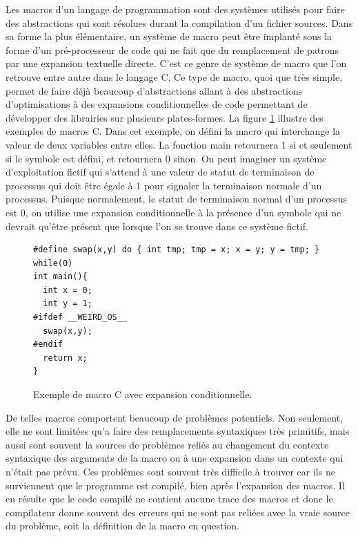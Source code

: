 \documentclass[12pt,oneside,letterpaper,francais]{book}
\newcommand{\scheme}[1]{\selectlanguage{english}{\tt #1}\selectlanguage{french}}
\begin{document}
Les macros d'un langage de programmation sont des systèmes utilisés
pour faire des abstractions qui sont résolues durant la compilation
d'un fichier sources. Dans sa forme la plus élémentaire, un système de
macro peut être implanté sous la forme d'un pré-processeur de code qui
ne fait que du remplacement de patrons par une expansion textuelle
directe. C'est ce genre de système de macro que l'on retrouve entre
autre dans le langage C. Ce type de macro, quoi que très simple,
permet de faire déjà beaucoup d'abstractions allant à des abstractions
d'optimisations à des expansions conditionnelles de code permettant de
développer des librairies sur plusieurs plates-formes. La figure
\ref{Scheme:c-macros} illustre des exemples de macros C. Dans cet
exemple, on défini la macro \scheme{swap} qui interchange la valeur de
deux variables entre elles. La fonction main retournera 1 si et
seulement si le symbole \scheme{\_\_WEIRD\_OS\_\_} est défini, et
retournera 0 sinon. On peut imaginer un système d'exploitation fictif
qui s'attend à une valeur de statut de terminaison de processus qui
doit être égale à 1 pour signaler la terminaison normale d'un
processus. Puisque normalement, le statut de terminaison normal d'un
processus est 0, on utilise une expansion conditionnelle à la présence
d'un symbole qui ne devrait qu'être présent que lorsque l'on se trouve
dans ce système fictif.\\

\begin{figure}[htb!]
  \begin{verbatim}
#define swap(x,y) do { int tmp; tmp = x; x = y; y = tmp; } while(0)
int main(){
  int x = 0;
  int y = 1;
#ifdef __WEIRD_OS__
  swap(x,y);
#endif
  return x;
}
  \end{verbatim}
  \caption{Exemple de macro C avec expansion conditionnelle.}
  \label{Scheme:c-macros}
\end{figure}

De telles macros comportent beaucoup de problèmes potentiels. Non
seulement, elle ne sont limitées qu'a faire des remplacements
syntaxiques très primitifs, mais aussi sont souvent la sources de
problèmes reliés au changement du contexte syntaxique des arguments de
la macro ou à une expansion dans un contexte qui n'était pas
prévu. Ces problèmes sont souvent très difficile à trouver car ils ne
surviennent que le programme est compilé, bien après l'expansion des
macros. Il en résulte que le code compilé ne contient aucune trace des
macros et donc le compilateur donne souvent des erreurs qui ne sont
pas reliées avec la vraie source du problème, soit la définition de la
macro en question.
\end{document}
